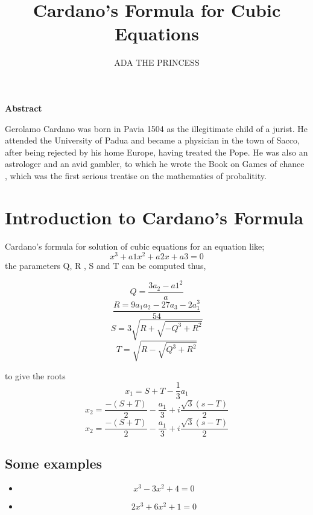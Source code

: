 \documentclass{article}
\begin{document}
	\author{ADA THE PRINCESS}
	\title{Cardano's Formula for Cubic Equations}
	\maketitle

	\begin{center}
		\textbf{Abstract}
	\end{center}
	Gerolamo Cardano was born in Pavia 1504 as the illegitimate child of a jurist. He attended the University of Padua and became a physician in the town of Sacco, after being rejected by his home Europe, having treated the Pope. He was also an astrologer and an avid gambler, to which he wrote the Book on Games of chance , which was the first serious treatise on the mathematics of probalitity. \cite{cardanoformula}
	
	\section{ Introduction to Cardano's Formula}
	Cardano's formula for solution of cubic equations for an equation like;
			\begin{equation}
			x^3 + a1x^2 + a2x + a3 = 0
		\end{equation}
		the parameters Q, R , S and T can be computed thus,
		
		\begin{equation}
			Q= \frac{3a_{2} - a{1}^2}{a}
		\end{equation}
		\begin{equation}
			\frac{R=9a_{1}a_{2}-27a_{3}-2a_{1}^3}{54}	
		\end{equation}
		\begin{equation}
			S=3\sqrt{R +\sqrt{-Q^3 + R^2}}
		\end{equation}
		\begin{equation}
			T=\sqrt{R-\sqrt{Q^3 + R^2}}
		\end{equation}
		
		to give the roots
		\begin{equation}
			x_{1}= S + T -\frac{1}{3}a_{1}
		\end{equation}
		\begin{equation}
			x_{2} =\frac{-(S +T)}{2} -\frac{a_{1}}{3} + i\frac{\sqrt{3}(s-T)}{2}
		\end{equation}
		\begin{equation}
			x_{2} =\frac{-(S +T)}{2} -\frac{a_{1}}{3} + i\frac{\sqrt{3}(s-T)}{2}
		\end{equation}
		\subsection{Some examples}
		
		\begin{itemize}
			\item	\begin{equation}
				x^3 - 3x^2 + 4 =0
			\end{equation}
			\item\begin{equation}
				2x^3 + 6x^2 + 1 =0
			\end{equation}
		\end{itemize}
	




\end{document}
